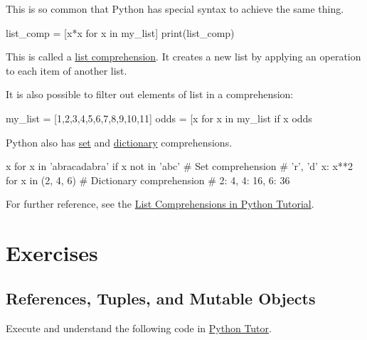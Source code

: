 \documentclass[12pt,letterpaper,twoside]{article}
\begin{document}
This is so common that Python has special syntax to achieve the same
thing.

\begin{python}
list_comp = [x*x for x in my_list]
print(list_comp)
\end{python}

This is called a
\href{https://docs.python.org/3/tutorial/datastructures.html\#list-comprehensions}{list
comprehension}. It creates a new list by applying an operation to each
item of another list.

It is also possible to filter out elements of list in a comprehension:

\begin{python}
my_list = [1,2,3,4,5,6,7,8,9,10,11]
odds = [x for x in my_list if x %
odds
\end{python}

Python also has
\href{https://docs.python.org/3/tutorial/datastructures.html#sets}{set}
and
\href{https://docs.python.org/3/tutorial/datastructures.html#dictionaries}{dictionary}
comprehensions.

\begin{python}
{x for x in 'abracadabra' if x not in 'abc'}  # Set comprehension
# {'r', 'd'}
{x: x**2 for x in (2, 4, 6)}                  # Dictionary comprehension
# {2: 4, 4: 16, 6: 36}
\end{python}

For further reference, see the 
\href{https://docs.python.org/3/tutorial/datastructures.html\#list-comprehensions}{List   Comprehensions in Python Tutorial}.

\newpage
\section{Exercises}

\subsection{References, Tuples, and Mutable Objects}
Execute and understand the following code in
\href{http://www.pythontutor.com/visualize.html\#code=sub_list_1\%20\%3D\%20\%5B1,3,8\%5D\%0Asub_list_2\%20\%3D\%20\%5B'z','y','x'\%5D\%0Amy_list\%20\%3D\%20\%5B2,\%20'a\%20string',\%20sub_list_1\%5D\%0Amy_list\%5B2\%5D\%20\%3D\%20sub_list_2\%0Amy_list\%5B2\%5D\%5B0\%5D\%20\%3D\%20'new\%20string'\%0A\%0Amy_tup\%20\%3D\%20(2,\%20'a\%20string',\%20sub_list_1\%29\%0A\%0A\%23\%20cannot\%20modify\%20tuple\%20references\%0A\%23\%20my_tup\%5B2\%5D\%20\%3D\%20sub_list_2\%0A\%0A\%23\%20we\%20can\%20modify\%20a\%20mutable\%20object\%20referenced\%20by\%20a\%20tuple\%0Amy_tup\%5B2\%5D\%5B0\%5D\%20\%3D\%20'from\%20my_tup'\%0A\%0A\%23\%20can\%20can\%20look\%20at\%20object\%20ids\%0Aprint(id(sub_list_1\%29\%29\%0Aprint(id(my_tup\%5B2\%5D\%29\%29\&cumulative=false\&curInstr=0\&heapPrimitives=false\&mode=display\&origin=opt-frontend.js\&py=3\&rawInputLstJSON=\%5B\%5D\&textReferences=false}{Python
Tutor}.
\end{document}
